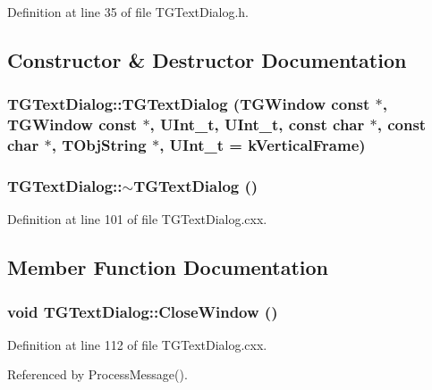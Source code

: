 Definition at line 35 of file TGTextDialog.h.

\subsection{Constructor \& Destructor Documentation}
\subsubsection[{TGTextDialog}]{\setlength{\rightskip}{0pt plus 5cm}TGTextDialog::TGTextDialog (TGWindow const $\ast$, \/  TGWindow const $\ast$, \/  UInt\_\-t, \/  UInt\_\-t, \/  const char $\ast$, \/  const char $\ast$, \/  TObjString $\ast$, \/  UInt\_\-t = {\ttfamily kVerticalFrame})}\label{classTGTextDialog_a4d4905561a982e79f392432ff82798e0}
\subsubsection[{$\sim$TGTextDialog}]{\setlength{\rightskip}{0pt plus 5cm}TGTextDialog::$\sim$TGTextDialog ()\hspace{0.3cm}{\ttfamily  [virtual]}}\label{classTGTextDialog_a21094d3d2e55fc5750db0d7f341fc344}


Definition at line 101 of file TGTextDialog.cxx.

\subsection{Member Function Documentation}
\subsubsection[{CloseWindow}]{\setlength{\rightskip}{0pt plus 5cm}void TGTextDialog::CloseWindow ()\hspace{0.3cm}{\ttfamily  [virtual]}}\label{classTGTextDialog_a86b82dfc3ac883e820b1372682fe5da4}


Definition at line 112 of file TGTextDialog.cxx.

Referenced by ProcessMessage().
